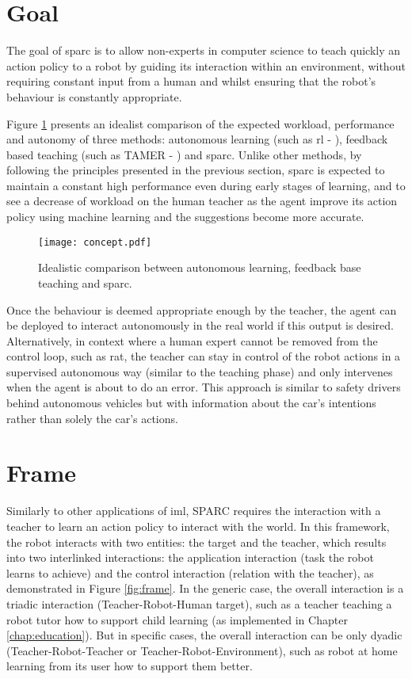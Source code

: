 \section{Goal}

The goal of \gls{sparc} is to allow non-experts in computer science to teach quickly an action policy to a robot by guiding its interaction within an environment, without requiring constant input from a human and whilst ensuring that the robot's behaviour is constantly appropriate. 

Figure \ref{fig:concept} presents an idealist comparison of the expected workload, performance and autonomy of three methods: autonomous learning (such as \gls{rl} - \citealt{sutton1998reinforcement}), feedback based teaching (such as TAMER - \citealt{knox2009interactively}) and \gls{sparc}. Unlike other methods, by following the principles presented in the previous section, \gls{sparc} is expected to maintain a constant high performance even during early stages of learning, and to see a decrease of workload on the human teacher as the agent improve its action policy using machine learning and the suggestions become more accurate.

\begin{figure}[ht]
	\texttt{[image: concept.pdf]}
	\centering
	\caption{Idealistic comparison between autonomous learning, feedback base teaching and \gls{sparc}.}
	\label{fig:concept}
\end{figure}

Once the behaviour is deemed appropriate enough by the teacher, the agent can be deployed to interact autonomously in the real world if this output is desired. Alternatively, in context where a human expert cannot be removed from the control loop, such as \acrlong{rat}, the teacher can stay in control of the robot actions in a supervised autonomous way (similar to the teaching phase) and only intervenes when the agent is about to do an error. This approach is similar to safety drivers behind autonomous vehicles but with information about the car's intentions rather than solely the car's actions. 

\section{Frame}

Similarly to other applications of \gls{iml}, SPARC requires the interaction with a teacher to learn an action policy to interact with the world. In this framework, the robot interacts with two entities: the target and the teacher, which results into two interlinked interactions: the application interaction (task the robot learns to achieve) and the control interaction (relation with the teacher), as demonstrated in Figure \ref{fig:frame}. In the generic case, the overall interaction is a triadic interaction (Teacher-Robot-Human target), such as a teacher teaching a robot tutor how to support child learning (as implemented in Chapter \ref{chap:education}). But in specific cases, the overall interaction can be only dyadic (Teacher-Robot-Teacher or Teacher-Robot-Environment), such as  robot at home learning from its user how to support them better.

